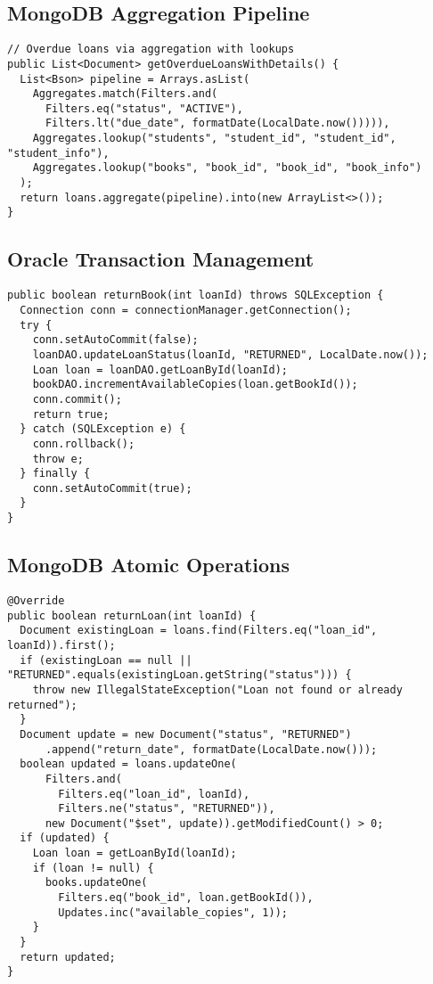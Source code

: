 \documentclass[12pt,a4paper]{article}
\begin{document}
\subsection{MongoDB Aggregation Pipeline}
\begin{lstlisting}[style=java, caption=MongoDB Aggregation Pipeline]
// Overdue loans via aggregation with lookups
public List<Document> getOverdueLoansWithDetails() {
  List<Bson> pipeline = Arrays.asList(
    Aggregates.match(Filters.and(
      Filters.eq("status", "ACTIVE"),
      Filters.lt("due_date", formatDate(LocalDate.now())))),
    Aggregates.lookup("students", "student_id", "student_id", "student_info"),
    Aggregates.lookup("books", "book_id", "book_id", "book_info")
  );
  return loans.aggregate(pipeline).into(new ArrayList<>());
}
\end{lstlisting}

\subsection{Oracle Transaction Management}
\begin{lstlisting}[style=java, caption=Oracle Transaction Management]
public boolean returnBook(int loanId) throws SQLException {
  Connection conn = connectionManager.getConnection();
  try {
    conn.setAutoCommit(false);
    loanDAO.updateLoanStatus(loanId, "RETURNED", LocalDate.now());
    Loan loan = loanDAO.getLoanById(loanId);
    bookDAO.incrementAvailableCopies(loan.getBookId());
    conn.commit();
    return true;
  } catch (SQLException e) {
    conn.rollback();
    throw e;
  } finally {
    conn.setAutoCommit(true);
  }
}
\end{lstlisting}

\subsection{MongoDB Atomic Operations}
\begin{lstlisting}[style=java, caption=MongoDB Atomic Operations]
@Override
public boolean returnLoan(int loanId) {
  Document existingLoan = loans.find(Filters.eq("loan_id", loanId)).first();
  if (existingLoan == null || "RETURNED".equals(existingLoan.getString("status"))) {
    throw new IllegalStateException("Loan not found or already returned");
  }
  Document update = new Document("status", "RETURNED")
      .append("return_date", formatDate(LocalDate.now()));
  boolean updated = loans.updateOne(
      Filters.and(
        Filters.eq("loan_id", loanId),
        Filters.ne("status", "RETURNED")),
      new Document("$set", update)).getModifiedCount() > 0;
  if (updated) {
    Loan loan = getLoanById(loanId);
    if (loan != null) {
      books.updateOne(
        Filters.eq("book_id", loan.getBookId()),
        Updates.inc("available_copies", 1));
    }
  }
  return updated;
}
\end{lstlisting}
\end{document}
